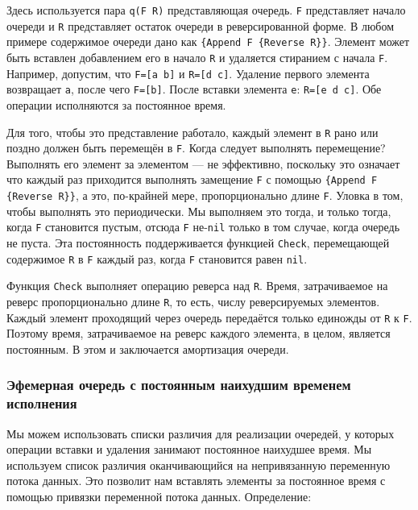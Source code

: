 Здесь используется пара \lstinline!q(F R)! представляющая очередь. \lstinline!F! представляет начало очереди и \lstinline!R! представляет остаток очереди в реверсированной форме. В любом примере содержимое очереди дано как \lstinline!{Append F {Reverse R}}!. Элемент может быть вставлен добавлением его в начало \lstinline!R! и удаляется стиранием с начала \lstinline!F!. Например, допустим, что \lstinline!F=[a b]! и \lstinline!R=[d c]!. Удаление первого элемента возвращает \lstinline!a!, после чего \lstinline!F=[b]!. После вставки элемента \lstinline!e!: \lstinline!R=[e d c]!. Обе операции исполняются за постоянное время.

Для того, чтобы это представление работало, каждый элемент в \lstinline!R! рано или поздно должен быть перемещён в \lstinline!F!. Когда следует выполнять перемещение? Выполнять его элемент за элементом --- не эффективно, поскольку это означает что каждый раз приходится выполнять замещение \lstinline!F! с помощью \lstinline!{Append F {Reverse R}}!, а это, по-крайней мере, пропорционально длине \lstinline!F!. Уловка в том, чтобы выполнять это периодически. Мы выполняем это тогда, и только тогда, когда \lstinline!F! становится пустым, отсюда \lstinline!F! не-\lstinline!nil! только в том случае, когда очередь не пуста. Эта постоянность поддерживается функцией \lstinline!Check!, перемещающей содержимое \lstinline!R! в \lstinline!F! каждый раз, когда \lstinline!F! становится равен \lstinline!nil!.

Функция \lstinline!Check! выполняет операцию реверса над \lstinline!R!. Время, затрачиваемое на реверс пропорционально длине \lstinline!R!, то есть, числу реверсируемых элементов. Каждый элемент проходящий через очередь передаётся только единожды от \lstinline!R! к \lstinline!F!. Поэтому время, затрачиваемое на реверс каждого элемента, в целом, является постоянным. В этом и заключается амортизация очереди.

\subsubsection{Эфемерная очередь с постоянным наихудшим временем исполнения}

Мы можем использовать списки различия для реализации очередей, у которых операции вставки и удаления занимают постоянное наихудшее время. Мы используем список различия оканчивающийся на непривязанную переменную потока данных. Это позволит нам вставлять элементы за постоянное время с помощью привязки переменной потока данных. Определение:

